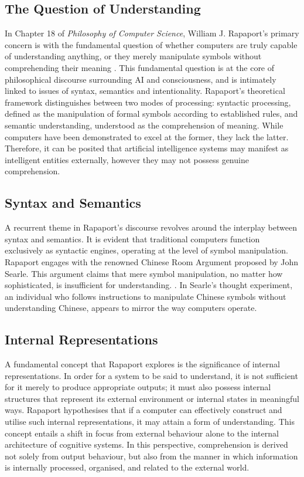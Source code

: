 \documentclass[runningheads]{llncs}
\begin{document}
\subsection{The Question of Understanding}
%
In Chapter 18 of \textit{Philosophy of Computer Science}, William J. Rapaport's primary concern is with the fundamental question of whether computers are truly capable of understanding anything, or they merely manipulate symbols without comprehending their meaning \cite{rapaport2005philosophy}. This fundamental question is at the core of philosophical discourse surrounding AI and consciousness, and is intimately linked to issues of syntax, semantics and intentionality.
Rapaport's theoretical framework distinguishes between two modes of processing: syntactic processing, defined as the manipulation of formal symbols according to established rules, and semantic understanding, understood as the comprehension of meaning. While computers have been demonstrated to excel at the former, they lack the latter. Therefore, it can be posited that artificial intelligence systems may manifest as intelligent entities externally, however they may not possess genuine comprehension.
%
%
\subsection{Syntax and Semantics}
%
A recurrent theme in Rapaport's discourse revolves around the interplay between syntax and semantics. It is evident that traditional computers function exclusively as syntactic engines, operating at the level of symbol manipulation.
Rapaport engages with the renowned Chinese Room Argument proposed by John Searle. This argument claims that mere symbol manipulation, no matter how sophisticated, is insufficient for understanding. \cite{searle1980minds}. In Searle's thought experiment, an individual who follows instructions to manipulate Chinese symbols without understanding Chinese, appears to mirror the way computers operate.
%
%
\subsection{Internal Representations}
%
A fundamental concept that Rapaport explores is the significance of internal representations. In order for a system to be said to understand, it is not sufficient for it merely to produce appropriate outputs; it must also possess internal structures that represent its external environment or internal states in meaningful ways. Rapaport hypothesises that if a computer can effectively construct and utilise such internal representations, it may attain a form of understanding.
This concept entails a shift in focus from external behaviour alone to the internal architecture of cognitive systems. In this perspective, comprehension is derived not solely from output behaviour, but also from the manner in which information is internally processed, organised, and related to the external world.
%
%
\end{document}

